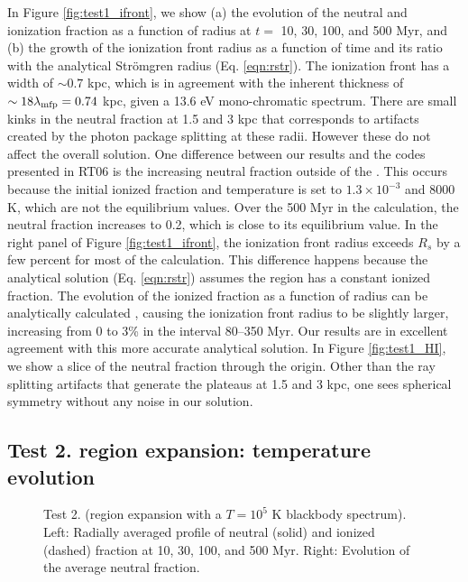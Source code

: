 \documentclass[useAMS,usenatbib]{mn2e}
\begin{document}
In Figure \ref{fig:test1_ifront}, we show (a) the evolution of the
neutral and ionization fraction as a function of radius at $t = $ 10,
30, 100, and 500 Myr, and (b) the growth of the ionization front
radius as a function of time and its ratio with the analytical
Str\"{o}mgren radius (Eq. \ref{eqn:rstr}).  The ionization front has a
width of $\sim0.7$ kpc, which is in agreement with the inherent
thickness of $\sim18 \lambda_{\rm mfp} = 0.74$ kpc, given a 13.6 eV
mono-chromatic spectrum.  There are small kinks in the neutral
fraction at 1.5 and 3 kpc that corresponds to artifacts created by the
photon package splitting at these radii.  However these do not affect
the overall solution.  One difference between our results and the
codes presented in RT06 is the increasing neutral fraction outside of
the \hii.  This occurs because the initial ionized fraction and
temperature is set to $1.3 \times 10^{-3}$ and 8000 K, which are not
the equilibrium values.  Over the 500 Myr in the calculation, the
neutral fraction increases to 0.2, which is close to its equilibrium
value.  In the right panel of Figure \ref{fig:test1_ifront}, the
ionization front radius exceeds $R_s$ by a few percent for most of the
calculation.  This difference happens because the analytical solution
(Eq. \ref{eqn:rstr}) assumes the \hii region has a constant
ionized fraction.  The evolution of the ionized fraction as a function
of radius can be analytically calculated \citep[e.g.][]{Osterbrock89,
  Petkova09}, causing the ionization front radius to be slightly
larger, increasing from 0 to 3\% in the interval 80--350 Myr.  Our
results are in excellent agreement with this more accurate analytical
solution.  In Figure \ref{fig:test1_HI}, we show a slice of the
neutral fraction through the origin.  Other than the ray splitting
artifacts that generate the plateaus at 1.5 and 3 kpc, one sees
spherical symmetry without any noise in our solution.

\subsection{Test 2. \hii region expansion: temperature evolution}

\begin{figure*}
  \caption{\label{fig:test2_1} Test 2. (\hii region
    expansion with a $T=10^5$ K blackbody spectrum).  Left:
    Radially averaged profile of neutral (solid) and ionized (dashed)
    fraction at 10, 30, 100, and 500 Myr.  Right: Evolution of the
    average neutral fraction.}
\end{figure*}
\end{document}
